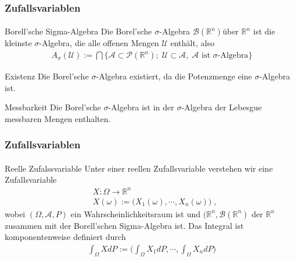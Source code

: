 \documentclass{beamer}
\begin{document}
\begin{frame}
    \frametitle{Zufallsvariablen}
\framesubtitle{}

\begin{block}{Borell'sche Sigma-Algebra}
Die Borel'sche   $\sigma$-Algebra $\mathcal{B}(\mathbb{R}^n)$über $\mathbb{R}^n$ ist die kleinste  $\sigma$-Algebra, die alle offenen Mengen $\mathcal{U}$ enthält, also 
\begin{align*}
A_\sigma (\mathcal{U}) := \bigcap \{  \mathcal{A} \subset \mathcal{P}(\mathbb{R}^n);  \;   \mathcal{U}  \subset  \mathcal{A},  \;  \mathcal{A} \text{ ist $\sigma$-Algebra} \}
\end{align*}
\end{block}

\begin{block}{Existenz}
Die Borel'sche   $\sigma$-Algebra existiert, da die Potenzmenge eine   $\sigma$-Algebra ist.
\end{block}

\begin{block}{Messbarkeit}
Die Borel'sche   $\sigma$-Algebra ist in der $\sigma$-Algebra der Lebesgue messbaren Mengen enthalten.
\end{block}
 \end{frame}





\begin{frame}
    \frametitle{Zufallsvariablen}
\framesubtitle{}

\begin{block}{Reelle Zufalssvariable}
Unter einer reellen Zufallsvariable verstehen wir eine Zufallsvariable 
\begin{align*}
& X : \Omega \to \mathbb{R}^n \\
& X(\omega) := \biggl(X_1(\omega), \cdots , X_n(\omega)  \biggr) \; ,
\end{align*}
wobei $(\Omega, \mathcal{A}, P)$ ein Wahrscheinlichkeitsraum ist und $(\mathbb{R}^n, \mathcal{B}(\mathbb{R}^n)$ der $\mathbb{R}^n$ zusammen mit der Borell'schen Sigma-Algebra ist. Das Integral ist komponentenweise definiert durch
\begin{align*} 
\int_{\Omega} X dP :=  \biggl( \int_{\Omega} X_1 dP, \cdots , \int_{\Omega} X_n dP    \biggr)
\end{align*}

\end{block}

 \end{frame}
\end{document}
